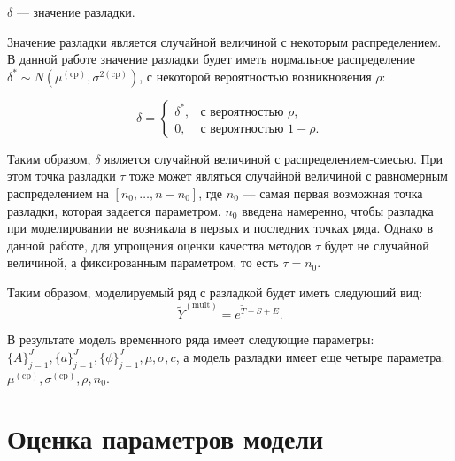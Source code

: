 \documentclass[%
12pt,
master,  %
natbib,      %
subf,        %
substylefile = spbu.rtx,
href,        %
colorlinks,  %
]{disser}
\begin{document}
$ \delta $  --- значение разладки.

Значение разладки является случайной величиной с некоторым распределением. В данной работе значение разладки будет иметь нормальное распределение $ \delta^* \sim N(\mu^{\mathrm{(cp)}}, \sigma^{2\mathrm{(cp)}})  $, с некоторой вероятностью возникновения $ \rho $:

\begin{equation*}
\delta = \begin{cases}
    		\delta^*, & \textrm{с вероятностью } \rho, \\
  		0, & \textrm{с вероятностью } 1 - \rho.
	\end{cases} 
\end{equation*}

Таким образом, $\delta$ является случайной величиной с распределением-смесью. При этом точка разладки  $\tau$ тоже может являться случайной величиной с равномерным распределением на $ [n_0, \dots, n - n_0 ] $, где $ n_0 $ --- самая первая возможная точка разладки, которая задается параметром. $n_0$ введена намеренно, чтобы разладка при моделировании не возникала в первых и последних точках ряда. Однако в данной работе, для упрощения оценки качества методов $\tau$  будет не случайной величиной, а фиксированным параметром, то есть $\tau = n_0$.

Таким образом, моделируемый ряд с разладкой будет иметь следующий вид:
\begin{equation*}
\tilde{Y}^{\mathrm{(mult)}} = e^{\tilde{T} + S + E}. 
\end{equation*}

В результате модель временного ряда имеет следующие параметры: $ \{A\}_{j=1}^J,  \{a\}_{j=1}^J,  \{\phi\}_{j=1}^J, \mu, \sigma, c $, а модель разладки имеет еще четыре параметра: $ \mu^{\mathrm{(cp)}}, \sigma^{\mathrm{(cp)}}, \rho, n_0 $.


\section{Оценка параметров модели}\label{section:parameters_estiomation}
\end{document}
